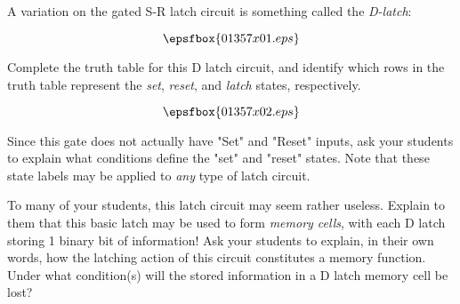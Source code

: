 

A variation on the gated S-R latch circuit is something called the {\it D-latch}:

$$\epsfbox{01357x01.eps}$$

Complete the truth table for this D latch circuit, and identify which rows in the truth table represent the {\it set}, {\it reset}, and {\it latch} states, respectively.







$$\epsfbox{01357x02.eps}$$







Since this gate does not actually have "Set" and "Reset" inputs, ask your students to explain what conditions define the "set" and "reset" states.  Note that these state labels may be applied to {\it any} type of latch circuit.

To many of your students, this latch circuit may seem rather useless.  Explain to them that this basic latch may be used to form {\it memory cells}, with each D latch storing 1 binary bit of information!  Ask your students to explain, in their own words, how the latching action of this circuit constitutes a memory function.  Under what condition(s) will the stored information in a D latch memory cell be lost?



